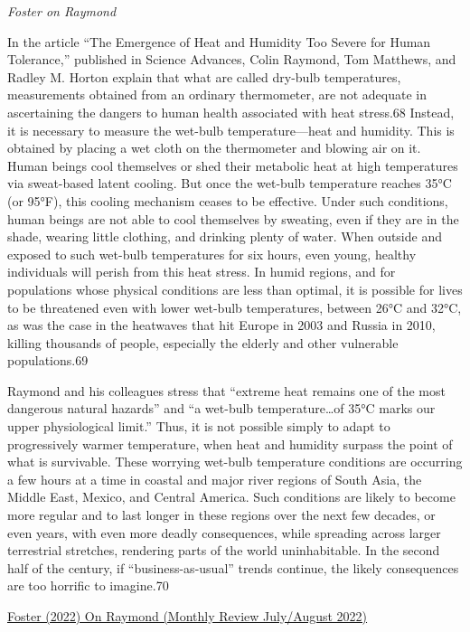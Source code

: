 \documentclass[
]{book}
\begin{document}
\emph{Foster on Raymond}

In the article ``The Emergence of Heat and Humidity Too Severe for Human Tolerance,'' published in Science Advances, Colin Raymond, Tom Matthews, and Radley M. Horton explain that what are called dry-bulb temperatures, measurements obtained from an ordinary thermometer, are not adequate in ascertaining the dangers to human health associated with heat stress.68 Instead, it is necessary to measure the wet-bulb temperature---heat and humidity. This is obtained by placing a wet cloth on the thermometer and blowing air on it. Human beings cool themselves or shed their metabolic heat at high temperatures via sweat-based latent cooling. But once the wet-bulb temperature reaches 35°C (or 95°F), this cooling mechanism ceases to be effective. Under such conditions, human beings are not able to cool themselves by sweating, even if they are in the shade, wearing little clothing, and drinking plenty of water. When outside and exposed to such wet-bulb temperatures for six hours, even young, healthy individuals will perish from this heat stress. In humid regions, and for populations whose physical conditions are less than optimal, it is possible for lives to be threatened even with lower wet-bulb temperatures, between 26°C and 32°C, as was the case in the heatwaves that hit Europe in 2003 and Russia in 2010, killing thousands of people, especially the elderly and other vulnerable populations.69

Raymond and his colleagues stress that ``extreme heat remains one of the most dangerous natural hazards'' and ``a wet-bulb temperature\ldots of 35°C marks our upper physiological limit.'' Thus, it is not possible simply to adapt to progressively warmer temperature, when heat and humidity surpass the point of what is survivable. These worrying wet-bulb temperature conditions are occurring a few hours at a time in coastal and major river regions of South Asia, the Middle East, Mexico, and Central America. Such conditions are likely to become more regular and to last longer in these regions over the next few decades, or even years, with even more deadly consequences, while spreading across larger terrestrial stretches, rendering parts of the world uninhabitable. In the second half of the century, if ``business-as-usual'' trends continue, the likely consequences are too horrific to imagine.70

\href{https://monthlyreview.org/2022/07/01/socialism-and-ecological-survival-an-introduction/}{Foster (2022) On Raymond (Monthly Review July/August 2022)}
\end{document}
